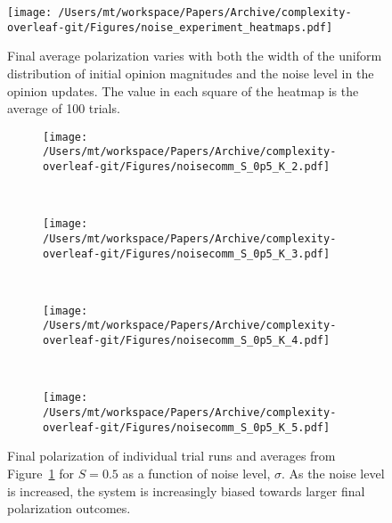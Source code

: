 \begin{figure}[H]
  \centering
  \texttt{[image: /Users/mt/workspace/Papers/Archive/complexity-overleaf-git/Figures/noise\_experiment\_heatmaps.pdf]}
  \caption{Final average polarization varies with both the width of the
    uniform distribution of initial opinion magnitudes and the noise level in
    the opinion updates. The value in each square of the heatmap is the average of
    100 trials. 
  }
  \label{fig:heatmaps}
\end{figure}

\begin{figure}[H]
  \centering
      \begin{subfigure}[t]{0.49\textwidth}
          \centering
          \texttt{[image: /Users/mt/workspace/Papers/Archive/complexity-overleaf-git/Figures/noisecomm\_S\_0p5\_K\_2.pdf]}
      \end{subfigure}
      ~
      \begin{subfigure}[t]{0.49\textwidth}
          \centering
          \texttt{[image: /Users/mt/workspace/Papers/Archive/complexity-overleaf-git/Figures/noisecomm\_S\_0p5\_K\_3.pdf]}
      \end{subfigure} \\
      \begin{subfigure}[t]{0.49\textwidth}
          \centering
          \texttt{[image: /Users/mt/workspace/Papers/Archive/complexity-overleaf-git/Figures/noisecomm\_S\_0p5\_K\_4.pdf]}
      \end{subfigure}
      ~
      \begin{subfigure}[t]{0.49\textwidth}
          \centering
          \texttt{[image: /Users/mt/workspace/Papers/Archive/complexity-overleaf-git/Figures/noisecomm\_S\_0p5\_K\_5.pdf]}
      \end{subfigure}
  \caption{Final polarization of individual trial runs and averages from
    Figure~\ref{fig:heatmaps} for $S=0.5$ as a function of noise level, $\sigma$. 
    As the noise level is increased, the system is increasingly biased towards larger final polarization outcomes.
  }
  \label{fig:single-runs-commnoise}
\end{figure}


